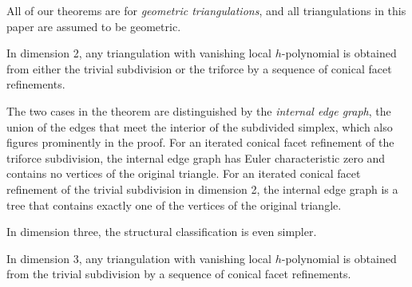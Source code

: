 All of our theorems are for \emph{geometric triangulations}, and all triangulations in this paper are assumed to be geometric.

\begin{theorem} \label{thm:dim2}
In dimension 2, any triangulation with vanishing local $h$-polynomial is obtained from either the trivial subdivision or the triforce by a sequence of conical facet refinements.
\end{theorem}

\noindent The two cases in the theorem are distinguished by the \emph{internal edge graph}, \ie the union of the edges that meet the interior of the subdivided simplex, which also figures prominently in the proof. For an iterated conical facet refinement of the triforce subdivision, the internal edge graph has Euler characteristic zero and contains no vertices of the original triangle. For an iterated conical facet refinement of the trivial subdivision in dimension 2, the internal edge graph is a tree that contains exactly one of the vertices of the original triangle.

In dimension three, the structural classification is even simpler.

\begin{theorem} \label{thm:dim3}
In dimension 3, any triangulation with vanishing local $h$-polynomial is obtained from the trivial subdivision by a sequence of conical facet refinements.
\end{theorem}